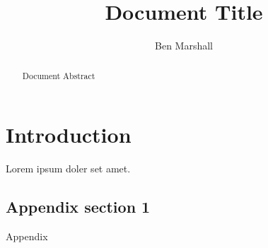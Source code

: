 \documentclass[a4paper,12pt, twoside]{article}
\title{
    Document Title
}
\author{
    Ben Marshall
}
\begin{document}
\maketitle %

\begin{abstract}
Document Abstract
\end{abstract}

\tableofcontents


\section{Introduction}

Lorem ipsum doler set amet.


\newpage
\nocite{*} %





\newpage
\begin{appendices}

\section{Appendix section 1}

Appendix

\end{appendices}
\end{document}
